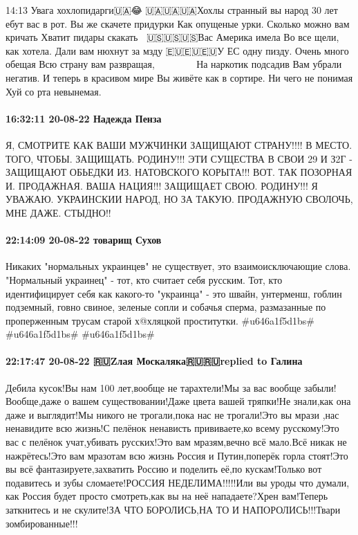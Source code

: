14:13
Увага хохлопидарги🇺🇦😂
🇺🇦🇺🇦🇺🇦Хохлы странный вы народ
30 лет ебут вас в рот.
Вы же скачете придурки
Как опущеные урки.
Сколько можно вам кричать
Хватит пидары скакать🏳‍🌈
🇺🇸🇺🇸🇺🇸Вас Америка имела
Во все щели, как хотела.
Дали вам нюхнут за мзду
🇪🇺🇪🇺🇪🇺У ЕС одну пизду.
Очень много обещая
Всю страну вам развращая, 🏳‍🌈🇺🇦🏳‍🌈🇺🇦🇺🇸🏳‍🌈😂
На наркотик подсадив
Вам убрали негатив.
И теперь в красивом мире
Вы живёте как в сортире.
Ни чего не понимая
Хуй со рта невынемая.
🏳‍🌈🇺🇦🇺🇸🏳‍🌈🇺🇦🏳‍🌈🇺🇸😂😂😂

\paragraph{16:32:11 20-08-22 Надежда Пенза}

Я, СМОТРИТЕ КАК ВАШИ МУЖЧИНКИ ЗАЩИЩАЮТ СТРАНУ!!!!
В МЕСТО. ТОГО, ЧТОБЫ. ЗАЩИЩАТЬ. РОДИНУ!!!
ЭТИ СУЩЕСТВА В СВОИ 29 И З2Г - ЗАЩИЩАЮТ ОБЬЕДКИ
ИЗ. НАТОВСКОГО КОРЫТА!!!
ВОТ. ТАК ПОЗОРНАЯ И. ПРОДАЖНАЯ. ВАША НАЦИЯ!!!
ЗАЩИЩАЕТ СВОЮ. РОДИНУ!!!
Я УВАЖАЮ. УКРАИНСКИИ НАРОД, НО ЗА ТАКУЮ. ПРОДАЖНУЮ СВОЛОЧЬ, МНЕ ДАЖЕ. СТЫДНО!!

\paragraph{22:14:09 20-08-22 товарищ Сухов}

Никаких "нормальных украинцев" не существует, это взаимоисключающие слова.
"Нормальный украинец" - тот, кто считает себя русским. Тот, кто идентифицирует
себя как какого-то "украинца" - это швайн, унтерменш, гоблин подземный, говно
свиное, зеленые сопли и собачья сперма, размазанные по проперженным трусам
старой х@хляцкой проститутки. #u646a1f5d1bs# #u646a1f5d1bs# #u646a1f5d1bs#

\paragraph{22:17:47 20-08-22 🇷🇺Zлая Москаляка🇷🇺🇷🇺replied to Галина}

Дебила кусок!Вы нам 100 лет,вообще не тарахтели!Мы за вас вообще
забыли!Вообще,даже о вашем существовании!Даже цвета вашей тряпки!Не знали,как
она даже и выглядит!Мы никого не трогали,пока нас не трогали!Это вы мрази ,нас
ненавидите всю жизнь!С пелёнок ненависть прививаете,ко всему русскому!Это вас с
пелёнок учат,убивать русских!Это вам мразям,вечно всё мало.Всё никак не
нажрётесь!Это вам мразотам всю жизнь Россия и Путин,поперёк горла стоят!Это вы
всё фантазируете,захватить Россию и поделить её,по кускам!Только вот подавитесь
и зубы сломаете!РОССИЯ НЕДЕЛИМА!!!!!Или вы уроды что думали, как Россия будет
просто смотреть,как вы на неё нападаете?Хрен вам!Теперь заткнитесь и не
скулите!ЗА ЧТО БОРОЛИСЬ,НА ТО И НАПОРОЛИСЬ!!!Твари зомбированные!!!
